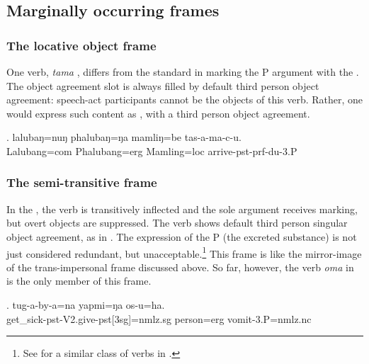 \subsection{Marginally occurring frames}\label{tr-marg}
\subsubsection{The locative object frame}\label{tr-loc}


\noindent
One verb,  \emph{tama} , differs from the standard  in  marking the P argument with the  .  The object agreement slot is always filled by default third person object agreement: speech-act participants cannot be the objects of this verb. Rather, one would express  such content as , with a third person object agreement.

\exg. lalubaŋ=nuŋ   phalubaŋ=ŋa   mamliŋ=be   tas-a-ma-c-u.\\
Lalubang{\sc =com} Phalubang{\sc =erg} Mamling{\sc =loc} arrive{\sc -pst-prf-du-3.P}\\
 
  
 

\subsubsection{The semi-transitive frame}\label{tr-semi}


\noindent
In the , the verb is transitively inflected and the sole argument receives  marking, but overt objects are suppres\-sed. The verb shows default third person singular object agreement, as in \Next. The expression of the P (the excreted substance) is not just considered redundant, but unacceptable.\footnote{See  \citet[1480]{Li2007Splitergativity} for a similar class of verbs in .} This frame is like the mirror-image of the trans-impersonal frame discussed above. So far, however, the verb \emph{oma}  in \Next is the only member of this frame.

\exg. tug-a-by-a=na yapmi=ŋa os-u=ha.\\
 get\_sick{\sc -pst-V2.give-pst[3sg]=nmlz.sg} person{\sc =erg} vomit{\sc -3.P=nmlz.nc}\\


